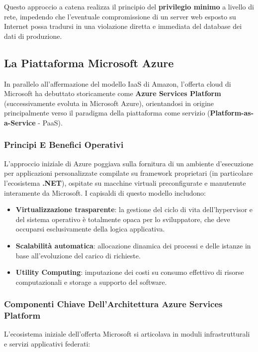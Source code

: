 \documentclass[11pt, a4paper]{article}
\begin{document}
Questo approccio a catena realizza il principio del \textbf{privilegio minimo} a livello di rete, impedendo che l'eventuale compromissione di un server web esposto su Internet possa tradursi in una violazione diretta e immediata del database dei dati di produzione.

\subsection{La Piattaforma Microsoft Azure}

In parallelo all'affermazione del modello IaaS di Amazon, l'offerta cloud di Microsoft ha debuttato storicamente come \textbf{Azure Services Platform} (successivamente evoluta in Microsoft Azure), orientandosi in origine principalmente verso il paradigma della piattaforma come servizio (\textbf{Platform-as-a-Service} - PaaS).


\subsubsection{Principi E Benefici Operativi}
L'approccio iniziale di Azure poggiava sulla fornitura di un ambiente d'esecuzione per applicazioni personalizzate compilate su framework proprietari (in particolare l'ecosistema \textbf{.NET}), ospitate su macchine virtuali preconfigurate e manutenute interamente da Microsoft. I capisaldi di questo modello includono:
\begin{itemize}
    \item \textbf{Virtualizzazione trasparente}: la gestione del ciclo di vita dell'hypervisor e del sistema operativo è totalmente opaca per lo sviluppatore, che deve occuparsi esclusivamente della logica applicativa.
    \item \textbf{Scalabilità automatica}: allocazione dinamica dei processi e delle istanze in base all'evoluzione del carico di richieste.
    \item \textbf{Utility Computing}: imputazione dei costi su consumo effettivo di risorse computazionali e storage a supporto del software.
\end{itemize}

\subsubsection{Componenti Chiave Dell'Architettura Azure Services Platform}
L'ecosistema iniziale dell'offerta Microsoft si articolava in moduli infrastrutturali e servizi applicativi federati:
\end{document}
